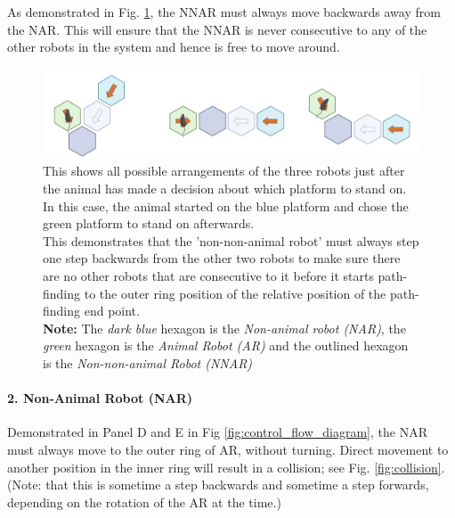 As demonstrated in Fig. \ref{fig:post_decision_states}, the NNAR must always move backwards away from the NAR. This will ensure that the NNAR is never consecutive to any of the other robots in the system and hence is free to move around.


\begin{figure}[H]
    \centering
    \includegraphics[scale = 0.5]{images/post_decision_state.png}
    \caption{This shows all possible arrangements of the three robots just after the animal has made a decision about which platform to stand on. In this case, the animal started on the blue platform and chose the green platform to stand on afterwards. \\ This demonstrates that the 'non-non-animal robot' must always step one step backwards from the other two robots to make sure there are no other robots that are consecutive to it before it starts path-finding to the outer ring position of the relative position of the path-finding end point.\\ \textbf{Note:} The \textit{dark blue} hexagon is the \textit{Non-animal robot (NAR)}, the \textit{green} hexagon is the \textit{Animal Robot (AR)} and the outlined hexagon is the \textit{Non-non-animal Robot (NNAR)}}
    \label{fig:post_decision_states}
\end{figure}

\paragraph{2. Non-Animal Robot (NAR)}

Demonstrated in Panel D and E in Fig \ref{fig:control_flow_diagram}, the NAR must always move to the outer ring of AR, without turning. Direct movement to another position in the inner ring will result in a collision; see Fig. \ref{fig:collision}. (Note: that this is sometime a step backwards and sometime a step forwards, depending on the rotation of the AR at the time.)

